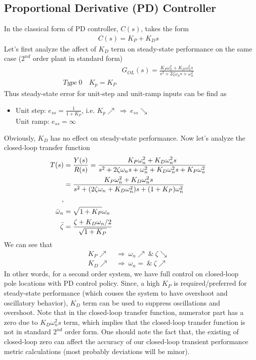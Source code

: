 \documentclass[twoside]{article}
\begin{document}
\subsection{Proportional Derivative (PD) Controller}

In the classical form of PD controller, $C(s)$, takes the form
%
\begin{align*}
 C(s) = K_P + K_D s
\end{align*}
%
Let's first analyze the affect of $K_D$ term on steady-state 
performance on the same case ($2^{nd}$ order plant in standard form) 
%
\begin{align*}
  &G_{OL}(s) = \frac{K_P \omega_n^2 + K_D \omega_n^2 s}{s^2 + 2 \zeta
    \omega_n s + \omega_n^2}
\\
 Type \ 0 \quad K_p = K_P
\end{align*}
% 
Thus steady-state error for unit-step and unit-ramp inputs can be find
as
\begin{itemize}
\item Unit step: $e_{ss} = \frac{1}{1 + K_P}$, i.e. $K_p \nearrow \
  \Rightarrow \ e_{ss} \searrow$  
\\ Unit ramp: $e_{ss} = \infty$
\end{itemize}
Obviously, $K_D$ has no effect on steady-state performance. Now
let's analyze the closed-loop transfer function
%
  \begin{align*}
  T(s) &= \frac{Y(s)}{R(s)} = \frac{K_P \omega_n^2 + K_D \omega_n^2 s}{s^2 + 2 \zeta
    \omega_n  s + \omega_n^2 + K_D \omega_n^2 s + K_P \omega_n^2}
\\
  &=   \frac{K_P \omega_n^2 + K_D \omega_n^2 s}{s^2 + ( 2 \zeta
    \omega_n + K_D \omega_n^2) s + (1 + K_P) \omega_n^2}
\\
,
\\
 \Bar{\omega}_n &= \sqrt{1 + K_P} \omega_n
\\
 \bar{\zeta} &= \frac{\zeta + K_D \omega_n / 2}{ \sqrt{ 1 + K_P} } 
  \end{align*}
%
We can see that
%
  \begin{align*}
    K_P \nearrow \ &\Rightarrow \ \omega_n \nearrow \ \& \ \zeta \searrow
\\
   K_D \nearrow \ &\Rightarrow \ \omega_n = \ \& \ \zeta \nearrow
  \end{align*}
%
In other words, for a second order system, we have full control on
closed-loop pole locations with PD control policy. Since, a high $K_P$
is required/preferred for steady-state performance (which couses 
the system to have overshoot and oscillatory behavior), $K_D$
term can be used to suppress oscillations and overshoot.
Note that in the closed-loop transfer function, numerator part
has a zero due to $K_D \omega_n^2 s$ term, which implies that
the closed-loop transfer function is not in standard $2^{nd}$ order
form. One should note the fact that, the existing of closed-loop
zero can affect the accuracy of our closed-loop transient performance
metric calculations (most probably deviations will be minor).
%
\end{document}
